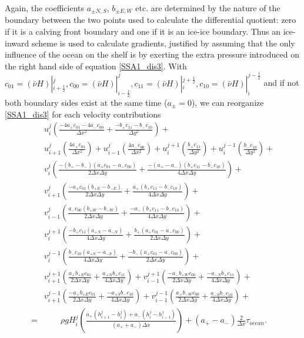 \documentclass[a4paper,10pt]{article}
\begin{document}
Again, the coefficients $a_{\pm N,S}$, $b_{\pm E,W}$ etc. are determined by the nature of the boundary between the two points used to calculate the differential quotient: zero if it is a calving front boundary and one if it is an ice-ice boundary. Thus an ice-inward scheme is used to calculate gradients, justified by assuming that the only influence of the ocean on the shelf is by exerting the extra pressure introduced on the right hand side of equation \eqref{SSA1_dis3}.\newline
\newline
With $c_{01}=(\bar{\nu}H)|_{i+\frac{1}{2}}^j, c_{00}=(\bar{\nu}H)|_{i-\frac{1}{2}}^j, c_{11}=(\bar{\nu}H)|_{i}^{j+\frac{1}{2}}, c_{10}=(\bar{\nu}H)|_{i}^{j-\frac{1}{2}}$ and if not both boundary sides exist at the same time ($a_{\pm}=0$), we can reorganize \eqref{SSA1_dis3} for each velocity contributions
\begin{align}
& u_{i}^{j}\left(\frac{-4a_+c_{01}-4a_-c_{00}}{\Delta x^2}+\frac{-b_+c_{11}-b_-c_{10}}{\Delta y^2}\right)+ \nonumber \\
& u_{i+1}^{j}\left(\frac{4a_+c_{01}}{\Delta x^2}\right)+u_{i-1}^{j}\left(\frac{4a_-c_{00}}{\Delta x^2}\right)+u_{i}^{j+1}\left(\frac{b_+c_{11}}{\Delta y^2}\right)+u_{i}^{j-1}\left(\frac{b_-c_{10}}{\Delta y^2}\right)+ \nonumber \\
& v_{i}^{j}\left(\frac{-(b_+-b_-)(a_+ c_{01}-a_- c_{00})}{2 \Delta x \Delta y}+\frac{-(a_+-a_-)(b_+ c_{11}-b_- c_{10})}{4 \Delta x \Delta y}\right)+ \nonumber \\
& v_{i+1}^{j}\left(\frac{-a_+ c_{01} (b_{+E}-b_{-E})}{2 \Delta x \Delta y}+\frac{a_+ (b_{+}c_{11}-b_{-}c_{10})}{4 \Delta x \Delta y}\right)+ \nonumber \\
& v_{i-1}^{j}\left(\frac{a_- c_{00} (b_{+W}-b_{-W})}{2 \Delta x \Delta y}+\frac{-a_-(b_{+}c_{11}-b_{-}c_{10})}{4 \Delta x \Delta y}\right)+ \nonumber \\
& v_{i}^{j+1}\left(\frac{-b_+ c_{11} (a_{+N}-a_{-N})}{4 \Delta x \Delta y}+\frac{b_+(a_{+}c_{01}-a_{-}c_{00})}{2 \Delta x \Delta y}\right)+ \nonumber \\
& v_{i}^{j-1}\left(\frac{b_- c_{10} (a_{+S}-a_{-S})}{4 \Delta x \Delta y}+\frac{-b_-(a_{+}c_{01}-a_{-}c_{00})}{2 \Delta x \Delta y}\right)+ \nonumber \\
& v_{i+1}^{j+1}\left(\frac{a_+ b_{+E} c_{01}}{2 \Delta x \Delta y}+\frac{a_{+N} b_{+} c_{11}}{4 \Delta x \Delta y}\right)+ v_{i-1}^{j+1}\left(\frac{-a_- b_{+W} c_{00}}{2 \Delta x \Delta y}+\frac{-a_{-N} b_{+} c_{11}}{4 \Delta x \Delta y}\right)+ \nonumber \\
& v_{i+1}^{j-1}\left(\frac{-a_+ b_{+E} c_{01}}{2 \Delta x \Delta y}+\frac{-a_{+S} b_{-} c_{10}}{4 \Delta x \Delta y}\right)+ v_{i-1}^{j-1}\left(\frac{a_+ b_{-W} c_{00}}{2 \Delta x \Delta y}+\frac{a_{-S} b_{-} c_{10}}{4 \Delta x \Delta y}\right)+ \nonumber \\
= &\qquad \rho gH_{i}^{j} \left(\frac{a_+(h_{i+1}^{j}-h_{i}^{j})+a_-(h_{i}^{j}-h_{i-1}^{j})}{(a_++a_-)\Delta x}\right) + (a_+ - a_-)\frac{2}{\Delta x}\tau_{ocean}. \label{SSA1_dis4}
\end{align}
\end{document}
